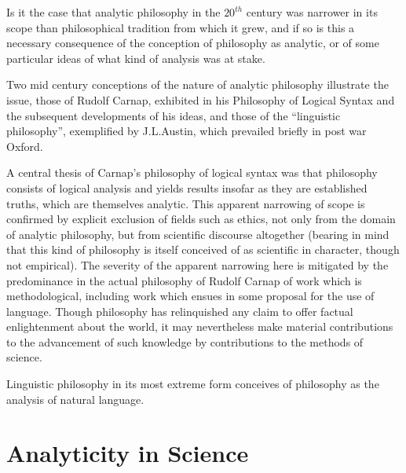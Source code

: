 Is it the case that analytic philosophy in the $20^{th}$ century was
narrower in its scope than philosophical tradition from which it grew,
and if so is this a necessary consequence of the conception of
philosophy as analytic, or of some particular ideas of what kind of
analysis was at stake.

Two mid century conceptions of the nature of analytic philosophy
illustrate the issue, those of Rudolf Carnap, exhibited in his
Philosophy of Logical Syntax and the subsequent developments of his
ideas, and those of the ``linguistic philosophy'', exemplified by
J.L.Austin, which prevailed briefly in post war Oxford.

A central thesis of Carnap's philosophy of logical syntax was that
philosophy consists of logical analysis and yields results insofar as
they are established truths, which are themselves analytic.
This apparent narrowing of scope is confirmed by explicit exclusion of
fields such as ethics, not only from the domain of analytic
philosophy, but from scientific discourse altogether (bearing in mind
that this kind of philosophy is itself conceived of as scientific in
character, though not empirical).
The severity of the apparent narrowing here is mitigated by the
predominance in the actual philosophy of Rudolf Carnap of work which
is methodological, including work which ensues in some proposal for
the use of language.
Though philosophy has relinquished any claim to offer factual
enlightenment about the world, it may nevertheless make material
contributions to the advancement of such knowledge by contributions to
the methods of science.

Linguistic philosophy in its most extreme form conceives of philosophy
as the analysis of natural language.


\section{Analyticity in Science}
